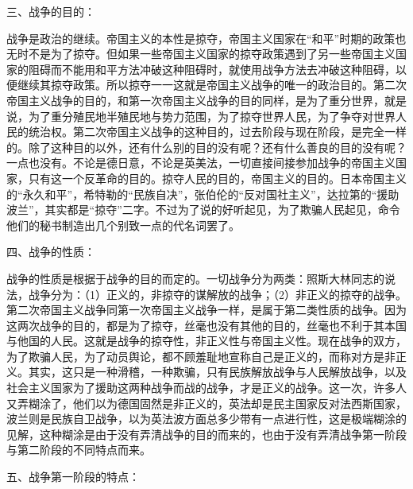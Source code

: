 三、战争的目的：

战争是政治的继续。帝国主义的本性是掠夺，帝国主义国家在“和平”时期的政策也无时不是为了掠夺。但如果一些帝国主义国家的掠夺政策遇到了另一些帝国主义国家的阻碍而不能用和平方法冲破这种阻碍时，就使用战争方法去冲破这种阻碍，以便继续其掠夺政策。所以掠夺一一这就是帝国主义战争的唯一的政治目的。第二次帝国主义战争的目的，和第一次帝国主义战争的目的同样，是为了重分世界，就是说，为了重分殖民地半殖民地与势力范围，为了掠夺世界人民，为了争夺对世界人民的统治权。第二次帝国主义战争的这种目的，过去阶段与现在阶段，是完全一样的。除了这种目的以外，还有什么别的目的没有呢？还有什么善良的目的没有呢？一点也没有。不论是德日意，不论是英美法，一切直接间接参加战争的帝国主义国家，只有这一个反革命的目的。掠夺人民的目的，帝国主义的目的。日本帝国主义的“永久和平”，希特勒的“民族自决”，张伯伦的“反对国社主义”，达拉第的“援助波兰”，其实都是“掠夺”二字。不过为了说的好听起见，为了欺骗人民起见，命令他们的秘书制造出几个别致一点的代名词罢了。

四、战争的性质：

战争的性质是根据于战争的目的而定的。一切战争分为两类：照斯大林同志的说法，战争分为：（1）正义的，非掠夺的谋解放的战争；（2）非正义的掠夺的战争。第二次帝国主义战争同第一次帝国主义战争一样，是属于第二类性质的战争。因为这两次战争的目的，都是为了掠夺，丝毫也没有其他的目的，丝毫也不利于其本国与他国的人民。这就是战争的掠夺性，非正义性与帝国主义性。现在战争的双方，为了欺骗人民，为了动员舆论，都不顾羞耻地宣称自己是正义的，而称对方是非正义。其实，这只是一种滑稽，一种欺骗，只有民族解放战争与人民解放战争，以及社会主义国家为了援助这两种战争而战的战争，才是正义的战争。这一次，许多人又弄糊涂了，他们以为德国固然是非正义的，英法却是民主国家反对法西斯国家，波兰则是民族自卫战争，以为英法波方面总多少带有一点进行性，这是极端糊涂的见解，这种糊涂是由于没有弄清战争的目的而来的，也由于没有弄清战争第一阶段与第二阶段的不同特点而来。

五、战争第一阶段的特点：

